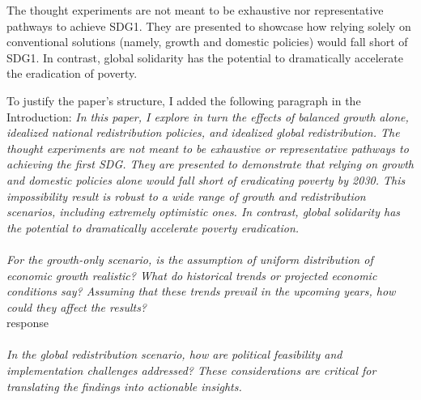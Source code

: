 \documentclass[12pt,english]{article}
\begin{document}
The thought experiments are not meant to be exhaustive nor representative pathways to achieve SDG1. They are presented to showcase how relying solely on conventional solutions (namely, growth and domestic policies) would fall short of SDG1. In contrast, global solidarity has the potential to dramatically accelerate the eradication of poverty.

To justify the paper's structure, I added the following paragraph in the Introduction: \textit{In this paper, I explore in turn the effects of balanced growth alone, idealized national redistribution policies, and idealized global redistribution. The thought experiments are not meant to be exhaustive or representative pathways to achieving the first SDG. They are presented to demonstrate that relying on growth and domestic policies alone would fall short of eradicating poverty by 2030. This impossibility result is robust to a wide range of growth and redistribution scenarios, including extremely optimistic ones. In contrast, global solidarity has the potential to dramatically accelerate poverty eradication.}
~\\ ~\\

\textit{For the growth-only scenario, is the assumption of uniform distribution of economic growth realistic? What do historical trends or projected economic conditions say? Assuming that these trends prevail in the upcoming years, how could they affect the results? }~\\

response
~\\ ~\\

\textit{In the global redistribution scenario, how are political feasibility and implementation challenges addressed? These considerations are critical for translating the findings into actionable insights. }~\\
\end{document}
